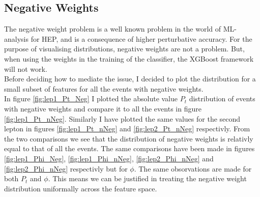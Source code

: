 \subsection{Negative Weights}
The negative weight problem is a well known problem in the world of ML-analysis for HEP, 
and is a consequence of higher perturbative accuracy. For the purpose of visualising 
distributions, negative weights are not a problem. But, when using the weights in the 
training of the classifier, the XGBoost framework will not work. 
\\
Before deciding how to mediate the issue, I decided to plot the distribution for 
a small subset of features for all the events with negative weights.
\\
In figure \ref{fig:lep1_Pt_Neg} I plotted the absolute value $P_t$ distribution of events with
negative weights and compare it to all the events in figure \ref{fig:lep1_Pt_nNeg}. Similarly
I have plotted the same values for the second lepton in figures \ref{fig:lep1_Pt_nNeg} and \ref{fig:lep2_Pt_nNeg}
respectivly. From the two comparisons we see that the distribution of negative
weights is relativly equal to that of all the events. The same comparisons have
been made in figures \ref{fig:lep1_Phi_Neg}, \ref{fig:lep1_Phi_nNeg}, \ref{fig:lep2_Phi_nNeg}  
and \ref{fig:lep2_Phi_nNeg} respectivly but for $\phi$. The same obsorvations
are made for both $P_t$ and $\phi$. This means we can be justified in treating the 
negative weight distribution uniformally across the feature space.
